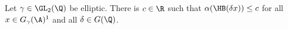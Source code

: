 Let $\gamma\in\GL_2(\Q)$ be elliptic. There is $c\in\R$ such that $\alpha(\HB(\delta x))\le c$ for all $x\in G_\gamma(\A)^1$ and all
$\delta\in G(\Q)$.
